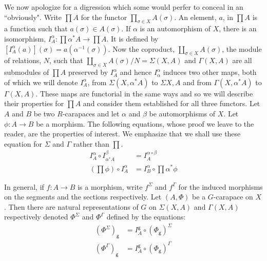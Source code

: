 We now apologize for a digression which some would perfer to conceal in an ``obviously". Write $\prod A$ for the functor $\prod_{\sigma \in X}A(\sigma)$. An element, $a$, in $\prod A$ is a function such that $a(\sigma) \in A(\sigma)$. If $\alpha$ is an automorphism of $X$, there is an isomorphism, $I_{A}^{\alpha} : \prod \alpha^{*}A \rightarrow \prod A$. It is defined by $\left[I_{A}^{\alpha}(a)\right](\sigma) = a(\alpha^{-1}(\sigma))$. Now the coproduct, $\coprod_{\sigma \in X} A(\sigma)$, the module of relations, $N$, such that $\coprod_{\sigma \in X}A(\sigma)/N = \Sigma(X, A)$ and $\Gamma(X, A)$ are all submodules of $\prod A$ preserved by $I_{A}^{\alpha}$ and hence $I_{\alpha}^{\alpha}$ induces two other maps, both of which we will denote $I_{A}^{\alpha}$, from $\Sigma(X, \alpha^{*} A)$ to $\Sigma{X, A}$ and from $\Gamma(X, \alpha^{*} A)$ to $\Gamma(X, A)$. These maps are functorial in the same ways and so we will describe their properties for $\prod A$ and consider them established for all three functors. Let $A$ and $B$ be two $R$-carapaces and let $\alpha$ and $\beta$ be automorphisms of $X$. Let $\phi : A\rightarrow B$ be a morphism. The following equations, whose proof we leave to the reader, are the properties of interest. We emphasize that we shall use these equation for $\Sigma$ and $\Gamma$ rather than $\prod$.
\begin{equation}
\begin{aligned}\label{art6-eq-8.3}
I_{A}^{\alpha} \circ I_{\alpha^{*} A}^{\beta} &= I_{A}^{\alpha \circ \beta}\\
\left(\prod \phi\right) \circ I_{A}^{\alpha} &= I_{B}^{\alpha} \circ \prod \alpha^{*}\phi
\end{aligned}
\end{equation}

In general, if $f: A\rightarrow B$ is a morphism, write $f^{\Sigma}$ and $f^{\Gamma}$ for the induced morphisms on the segments and the sections respectively. Let $(A, \Phi)$ be a $G$-carapace on $X$. Then there are natural representations of $G$ on $\Sigma(X, A)$ and $\Gamma(X, A)$ respectively denoted $\Phi^{\Sigma}$ and $\Phi^{\Gamma}$ defined by the equations:
\begin{equation}
\begin{aligned}\label{art6-eq-8.4}
\left(\Phi^{\Sigma}\right)_{\mathsf{g}} &= I_{A}^{\mathsf{g}} \circ (\Phi_{\mathsf{g}})^{\Sigma}\\
\left(\Phi^{\Gamma}\right)_{\mathsf{g}} &= I_{A}^{\mathsf{g}} \circ (\Phi_{\mathsf{g}})^{\Gamma}
\end{aligned}
\end{equation}


